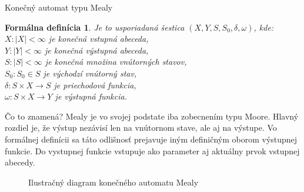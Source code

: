 \documentclass[11pt]{beamer}
\newtheorem{formal}{Formálna definícia}
\begin{document}
\begin{frame}{Konečný automat typu Mealy}
\begin{formal} 
Je to usporiadaná šestica $(X, Y, S, S_0, \delta, \omega)$, kde: 
\\ $X : | X | < \infty $ je konečná vstupná abeceda,
\\ $Y : | Y | < \infty$ je konečná výstupná abeceda,
\\ $S : | S | < \infty$ je konečná množina vnútorných stavov,
\\ $S_0 : S_0 \in S$ je východzí vnútorný stav,
\\ $ \delta : S \times X \rightarrow S $ je priechodová funkcia,
\\ $ \omega : S \times X \rightarrow Y$ je výstupná funkcia.
\end{formal}
\end{frame}

\begin{frame}{Čo to znamená?}
Mealy je vo svojej podstate iba zobecnením typu Moore. Hlavný rozdiel je, že výstup nezávisí len na vnútornom stave, ale aj na výstupe. Vo formálnej definícii sa táto odlišnosť prejavuje iným definičným oborom výstupnej funkcie. Do vystupnej funkcie vstupuje ako parameter aj aktuálny prvok vstupnej abecedy.
\begin{figure}[h]
\caption{Ilustračný diagram konečného automatu Mealy}
\end{figure}
\end{frame}
\end{document}
